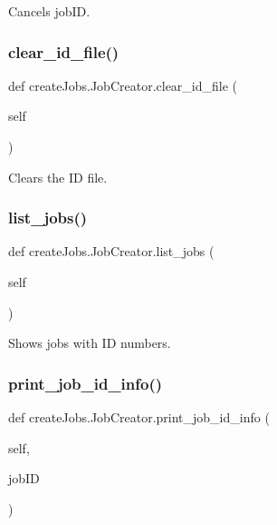 \begin{DoxyVerb}Cancels jobID.\end{DoxyVerb}
 \mbox{\label{classcreate_jobs_1_1_job_creator_ac17d5c68fafd5cf85a3d71b6e44faab3}} 
\subsubsection{\texorpdfstring{clear\_id\_file()}{clear\_id\_file()}}
{\footnotesize\ttfamily def create\+Jobs.\+Job\+Creator.\+clear\+\_\+id\+\_\+file (\begin{DoxyParamCaption}\item[{}]{self }\end{DoxyParamCaption})}

\begin{DoxyVerb}Clears the ID file.\end{DoxyVerb}
 \mbox{\label{classcreate_jobs_1_1_job_creator_a8c9ff9c96765e9a3b013e7dcadcbd9a1}} 
\subsubsection{\texorpdfstring{list\_jobs()}{list\_jobs()}}
{\footnotesize\ttfamily def create\+Jobs.\+Job\+Creator.\+list\+\_\+jobs (\begin{DoxyParamCaption}\item[{}]{self }\end{DoxyParamCaption})}

\begin{DoxyVerb}Shows jobs with ID numbers.\end{DoxyVerb}
 \mbox{\label{classcreate_jobs_1_1_job_creator_ae0b10eae3c888ae05ec48cab77af2abf}} 
\subsubsection{\texorpdfstring{print\_job\_id\_info()}{print\_job\_id\_info()}}
{\footnotesize\ttfamily def create\+Jobs.\+Job\+Creator.\+print\+\_\+job\+\_\+id\+\_\+info (\begin{DoxyParamCaption}\item[{}]{self,  }\item[{}]{job\+ID }\end{DoxyParamCaption})}

